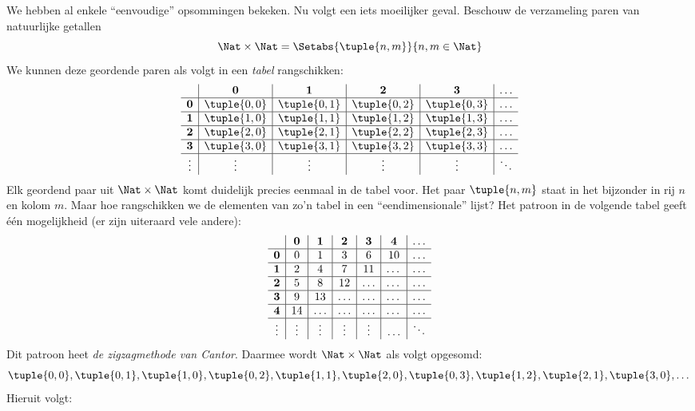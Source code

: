 \documentclass[openany]{memoir}
\begin{document}
\begin{explain}
We hebben al enkele ``eenvoudige'' opsommingen bekeken. Nu volgt een
iets moeilijker geval. Beschouw de verzameling paren van natuurlijke
getallen
\[
\Nat \times \Nat = \Setabs{\tuple{n,m}}{n,m \in \Nat}
\]
We kunnen deze geordende paren als volgt in een \emph{tabel} rangschikken:
\[
\begin{array}{ c | c | c | c | c | c}
& \mathbf 0 & \mathbf 1 & \mathbf 2 & \mathbf 3 & \dots \\
\hline
\mathbf 0 & \tuple{0,0} & \tuple{0,1} & \tuple{0,2} & \tuple{0,3} & \dots \\
\hline
\mathbf 1 & \tuple{1,0} & \tuple{1,1} & \tuple{1,2} & \tuple{1,3} & \dots \\
\hline
\mathbf 2 & \tuple{2,0} & \tuple{2,1} & \tuple{2,2} & \tuple{2,3} & \dots \\
\hline
\mathbf 3 & \tuple{3,0} & \tuple{3,1} & \tuple{3,2} & \tuple{3,3} & \dots \\
\hline
\vdots & \vdots & \vdots & \vdots & \vdots & \ddots\\
\end{array}
\]
Elk geordend paar uit $\Nat \times \Nat$ komt duidelijk precies eenmaal in de
tabel voor. Het paar $\tuple{n,m}$ staat in het bijzonder in rij $n$ en kolom
$m$. Maar hoe rangschikken we de elementen van zo'n tabel in een
``eendimensionale'' lijst? Het patroon in de volgende tabel geeft één
mogelijkheid (er zijn uiteraard vele andere):
\[
\begin{array}{ c | c | c | c | c | c | c}
& \mathbf 0 & \mathbf 1 & \mathbf 2 & \mathbf 3 & \mathbf 4 &\dots \\
\hline
\mathbf 0 & 0  & 1& 3 & 6& 10 &\ldots \\
\hline
\mathbf 1 &2 & 4& 7 & 11 & \dots &\ldots \\
\hline
\mathbf 2 & 5 & 8 & 12 & \ldots & \dots&\ldots \\
\hline
\mathbf 3 & 9 & 13 & \ldots & \ldots & \dots & \ldots \\
\hline
\mathbf 4 & 14 & \ldots & \ldots & \ldots & \dots & \ldots \\
\hline
\vdots & \vdots & \vdots & \vdots & \vdots&\ldots & \ddots\\
\end{array}
\]\noindent
Dit patroon heet \emph{de zigzagmethode van Cantor}. Daarmee wordt
$\Nat \times \Nat$ als volgt opgesomd:
\[
\tuple{0,0}, \tuple{0,1}, \tuple{1,0}, \tuple{0,2}, \tuple{1,1},
\tuple{2,0}, \tuple{0,3}, \tuple{1,2}, \tuple{2,1}, \tuple{3,0}, \dots
\]
Hieruit volgt:
\end{explain}
\end{document}
